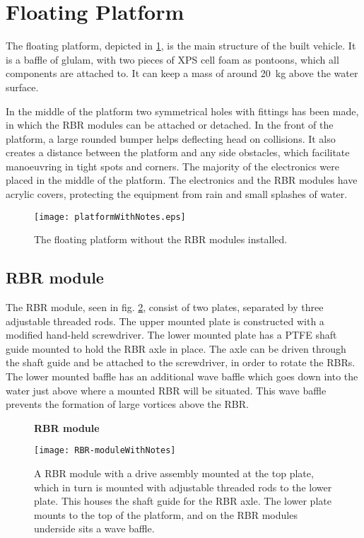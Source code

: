 \section{Floating Platform}
The floating platform, depicted in
\cref{fig:floatingPlatform}, is the main structure of the built vehicle.
It is a baffle of glulam, with two pieces of XPS cell foam as
pontoons, which all components are attached to. It can keep a mass of
around 20~kg above the water surface.%

In the middle of the platform two symmetrical holes with fittings has
been made, in which the RBR modules can be attached or detached. In the front of the platform, a large rounded bumper helps deflecting head on collisions. It also creates a distance between the platform and
any side obstacles, which facilitate manoeuvring in tight spots and corners. The majority of the electronics were placed in the middle of the platform. The electronics and the RBR modules have acrylic
covers, protecting the equipment from rain and small splashes of water.

\begin{figure}[h]
   \centering
   \texttt{[image: platformWithNotes.eps]}
   \caption{The floating platform without the RBR modules installed.}
   \label{fig:floatingPlatform}
\end{figure}

\subsection{RBR module}
The RBR module, seen in fig. \ref{fig:rbr-module}, consist of two plates, separated by three adjustable threaded
rods. The upper mounted plate is constructed with a modified hand-held screwdriver. The lower mounted
plate has a PTFE shaft guide mounted to hold the RBR axle in place. The axle can be driven through the shaft guide and be attached to the screwdriver, in order to rotate the RBRs. The lower mounted baffle has an
additional wave baffle which goes down into the water just above where a mounted RBR
will be situated. This wave baffle prevents the formation of large vortices above the RBR. 

\begin{figure}[H]
  \centering
  \textbf{RBR module}
  \par\medskip
  \texttt{[image: RBR-moduleWithNotes]}
  \caption{A RBR module with a drive assembly mounted at the top plate,
    which in turn is mounted with adjustable threaded rods to the lower plate. This houses the shaft guide for the RBR axle. The lower plate mounts to the
    top of the platform, and on the RBR modules underside sits a wave baffle.}\label{fig:rbr-module}
\end{figure}

